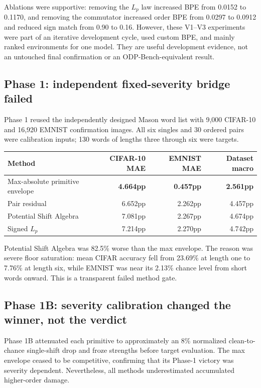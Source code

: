 \documentclass[11pt,a4paper]{article}
\begin{document}
Ablations were supportive: removing the $L_p$ law increased BPE from 0.0152 to
0.1170, and removing the commutator increased order BPE from 0.0297 to 0.0912
and reduced sign match from 0.90 to 0.16.  However, these V1--V3 experiments
were part of an iterative development cycle, used custom BPE, and mainly
ranked environments for one model.  They are useful development evidence, not
an untouched final confirmation or an ODP-Bench-equivalent result.

\subsection{Phase 1: independent fixed-severity bridge failed}

Phase 1 reused the independently designed Mason word list with 9,000 CIFAR-10
and 16,920 EMNIST confirmation images.  All six singles and 30 ordered pairs
were calibration inputs; 130 words of lengths three through six were targets.

\begin{center}
\begin{tabular}{lrrr}
\toprule
\textbf{Method} & \textbf{CIFAR-10 MAE} & \textbf{EMNIST MAE} & \textbf{Dataset macro}\\
\midrule
Max-absolute primitive envelope & \textbf{4.664pp} & \textbf{0.457pp} & \textbf{2.561pp}\\
Pair residual & 6.652pp & 2.262pp & 4.457pp\\
Potential Shift Algebra & 7.081pp & 2.267pp & 4.674pp\\
Signed $L_p$ & 7.214pp & 2.270pp & 4.742pp\\
\bottomrule
\end{tabular}
\end{center}

Potential Shift Algebra was 82.5\% worse than the max envelope.  The reason was
severe floor saturation: mean CIFAR accuracy fell from 23.69\% at length one to
7.76\% at length six, while EMNIST was near its 2.13\% chance level from short
words onward.  This is a transparent failed method gate.

\subsection{Phase 1B: severity calibration changed the winner, not the verdict}

Phase 1B attenuated each primitive to approximately an 8\% normalized
clean-to-chance single-shift drop and froze strengths before target evaluation.
The max envelope ceased to be competitive, confirming that its Phase-1 victory
was severity dependent.  Nevertheless, all methods underestimated accumulated
higher-order damage.
\end{document}
